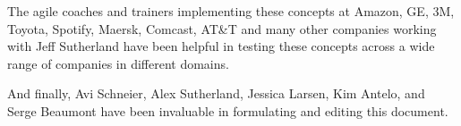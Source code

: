 \documentclass[12pt,a4paper,parskip=full]{scrartcl}
\begin{document}
The agile coaches and trainers implementing these concepts at Amazon, GE, 3M, Toyota, Spotify, Maersk, Comcast, AT\&T and many other companies working with Jeff Sutherland have been helpful in testing these concepts across a wide range of companies in different domains.

And finally, Avi Schneier, Alex Sutherland, Jessica Larsen, Kim Antelo, and Serge Beaumont have been invaluable in formulating and editing this document.

\pagebreak

\printbibliography
\end{document}
